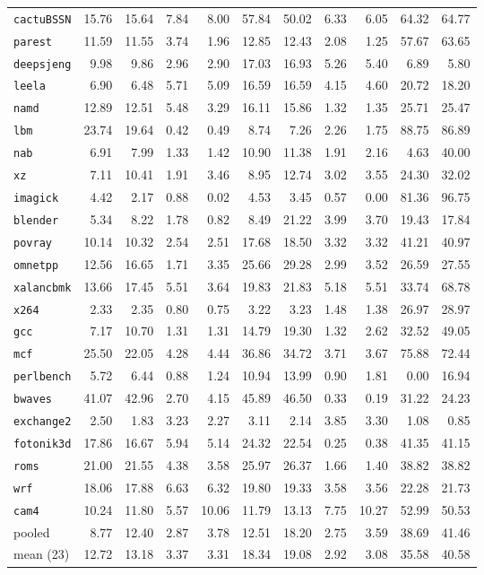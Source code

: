 \documentclass[10pt,a4paper]{article}
\newcommand{\ct}[1]{\texttt{#1}}
\begin{document}
{\begin{longtable}{@{}lrrrrrrrrrr@{}}
\bottomrule
\endlastfoot
\ct{cactuBSSN} & 15.76 & 15.64 & 7.84 & 8.00 & 57.84 & 50.02 & 6.33 & 6.05 & 64.32 & 64.77 \\
\ct{parest} & 11.59 & 11.55 & 3.74 & 1.96 & 12.85 & 12.43 & 2.08 & 1.25 & 57.67 & 63.65 \\
\ct{deepsjeng} & 9.98 & 9.86 & 2.96 & 2.90 & 17.03 & 16.93 & 5.26 & 5.40 & 6.89 & 5.80 \\
\ct{leela} & 6.90 & 6.48 & 5.71 & 5.09 & 16.59 & 16.59 & 4.15 & 4.60 & 20.72 & 18.20 \\
\ct{namd} & 12.89 & 12.51 & 5.48 & 3.29 & 16.11 & 15.86 & 1.32 & 1.35 & 25.71 & 25.47 \\
\ct{lbm} & 23.74 & 19.64 & 0.42 & 0.49 & 8.74 & 7.26 & 2.26 & 1.75 & 88.75 & 86.89 \\
\ct{nab} & 6.91 & 7.99 & 1.33 & 1.42 & 10.90 & 11.38 & 1.91 & 2.16 & 4.63 & 40.00 \\
\ct{xz} & 7.11 & 10.41 & 1.91 & 3.46 & 8.95 & 12.74 & 3.02 & 3.55 & 24.30 & 32.02 \\
\ct{imagick} & 4.42 & 2.17 & 0.88 & 0.02 & 4.53 & 3.45 & 0.57 & 0.00 & 81.36 & 96.75 \\
\ct{blender} & 5.34 & 8.22 & 1.78 & 0.82 & 8.49 & 21.22 & 3.99 & 3.70 & 19.43 & 17.84 \\
\ct{povray} & 10.14 & 10.32 & 2.54 & 2.51 & 17.68 & 18.50 & 3.32 & 3.32 & 41.21 & 40.97 \\
\ct{omnetpp} & 12.56 & 16.65 & 1.71 & 3.35 & 25.66 & 29.28 & 2.99 & 3.52 & 26.59 & 27.55 \\
\ct{xalancbmk} & 13.66 & 17.45 & 5.51 & 3.64 & 19.83 & 21.83 & 5.18 & 5.51 & 33.74 & 68.78 \\
\ct{x264} & 2.33 & 2.35 & 0.80 & 0.75 & 3.22 & 3.23 & 1.48 & 1.38 & 26.97 & 28.97 \\
\ct{gcc} & 7.17 & 10.70 & 1.31 & 1.31 & 14.79 & 19.30 & 1.32 & 2.62 & 32.52 & 49.05 \\
\ct{mcf} & 25.50 & 22.05 & 4.28 & 4.44 & 36.86 & 34.72 & 3.71 & 3.67 & 75.88 & 72.44 \\
\ct{perlbench} & 5.72 & 6.44 & 0.88 & 1.24 & 10.94 & 13.99 & 0.90 & 1.81 & 0.00 & 16.94 \\
\ct{bwaves} & 41.07 & 42.96 & 2.70 & 4.15 & 45.89 & 46.50 & 0.33 & 0.19 & 31.22 & 24.23 \\
\ct{exchange2} & 2.50 & 1.83 & 3.23 & 2.27 & 3.11 & 2.14 & 3.85 & 3.30 & 1.08 & 0.85 \\
\ct{fotonik3d} & 17.86 & 16.67 & 5.94 & 5.14 & 24.32 & 22.54 & 0.25 & 0.38 & 41.35 & 41.15 \\
\ct{roms} & 21.00 & 21.55 & 4.38 & 3.58 & 25.97 & 26.37 & 1.66 & 1.40 & 38.82 & 38.82 \\
\ct{wrf} & 18.06 & 17.88 & 6.63 & 6.32 & 19.80 & 19.33 & 3.58 & 3.56 & 22.28 & 21.73 \\
\ct{cam4} & 10.24 & 11.80 & 5.57 & 10.06 & 11.79 & 13.13 & 7.75 & 10.27 & 52.99 & 50.53 \\
\midrule
pooled & 8.77 & 12.40 & 2.87 & 3.78 & 12.51 & 18.20 & 2.75 & 3.59 & 38.69 & 41.46 \\
mean (23) & 12.72 & 13.18 & 3.37 & 3.31 & 18.34 & 19.08 & 2.92 & 3.08 & 35.58 & 40.58 \\
\end{longtable}
}
\end{document}
